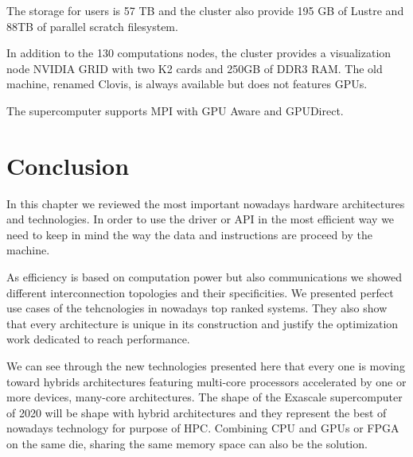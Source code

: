 The storage for users is 57 TB and the cluster also provide 195 GB of Lustre and 88TB of parallel scratch filesystem. 

In addition to the 130 computations nodes, the cluster provides a visualization node NVIDIA GRID with two K2 cards and 250GB of DDR3 RAM. 
The old machine, renamed Clovis, is always available but does not features GPUs. 

The supercomputer supports MPI with GPU Aware and GPUDirect. 

\section{Conclusion}

In this chapter we reviewed the most important nowadays hardware architectures and technologies. 
In order to use the driver or API in the most efficient way we need to keep in mind the way the data and instructions are proceed by the machine. 

As efficiency is based on computation power but also communications we showed different interconnection topologies and their specificities. 
We presented perfect use cases of the tehcnologies in nowadays top ranked systems.
They also show that every architecture is unique in its construction and justify the optimization work dedicated to reach performance. 

We can see through the new technologies presented here that every one is moving toward hybrids architectures featuring multi-core processors accelerated by one or more devices, many-core architectures. 
The shape of the Exascale supercomputer of 2020 will be shape with hybrid architectures and they represent the best of nowadays technology for purpose of HPC. 
Combining CPU and GPUs or FPGA on the same die, sharing the same memory space can also be the solution.

